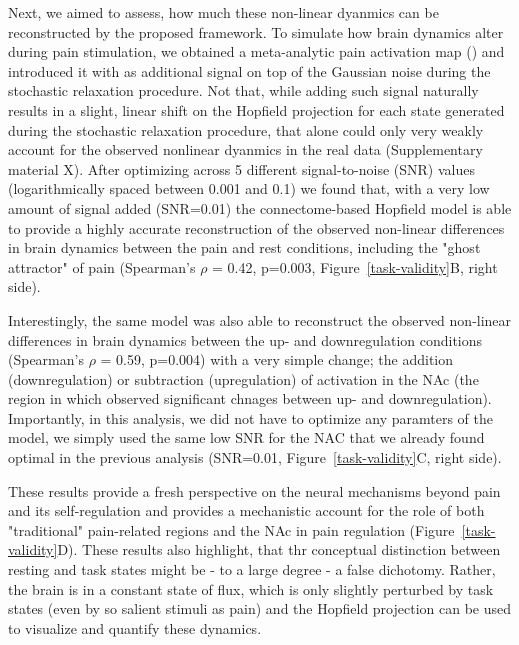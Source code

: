 \documentclass{article}
\begin{document}
Next, we aimed to assess, how much these non-linear dyanmics can be reconstructed by the proposed framework. To simulate how brain dynamics alter during pain stimulation, we obtained a meta-analytic pain activation map (\href{https://doi.org/10.1038/s41467-021-21179-3}{}) and introduced it with as additional signal on top of the Gaussian noise during the stochastic relaxation procedure. Not that, while adding such signal naturally results in a slight, linear shift on the Hopfield projection for each state generated during the stochastic relaxation procedure, that alone could only very weakly account for the observed nonlinear dyanmics in the real data (Supplementary material X). After optimizing across 5 different signal-to-noise (SNR) values (logarithmically spaced between 0.001 and 0.1) we found that, with a very low amount of signal added (SNR=0.01) the connectome-based Hopfield model is able to provide a highly accurate reconstruction of the observed non-linear differences in brain dynamics between the pain and rest conditions, including the "ghost attractor" of pain (Spearman's $\rho$ = 0.42, p=0.003, Figure~\ref{task-validity}B, right side).

Interestingly, the same model was also able to reconstruct the observed non-linear differences in brain dynamics between the up- and downregulation conditions (Spearman's $\rho$ = 0.59, p=0.004) with a very simple change; the addition (downregulation) or subtraction (upregulation) of activation in the NAc (the region in which \href{https://doi.org/10.1371/journal.pbio.1002036}{} observed significant chnages between up- and downregulation). Importantly, in this analysis, we did not have to optimize any paramters of the model, we simply used the same low SNR for the NAC that we already found optimal in the previous analysis (SNR=0.01, Figure~\ref{task-validity}C, right side).

These results provide a fresh perspective on the neural mechanisms beyond pain and its self-regulation and provides a mechanistic account for the role of both "traditional" pain-related regions and the NAc in pain regulation (Figure~\ref{task-validity}D). These results also highlight, that thr conceptual distinction between resting and task states might be - to a large degree - a false dichotomy. Rather, the brain is in a constant state of flux, which is only slightly perturbed by task states (even by so salient stimuli as pain) and the Hopfield projection can be used to visualize and quantify these dynamics.
\end{document}
